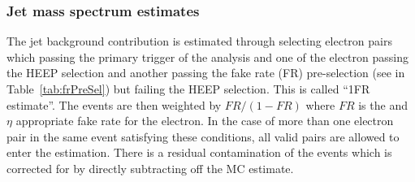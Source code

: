 %
%
%



\subsubsection{Jet mass spectrum estimates}

The jet background contribution is estimated through selecting electron pairs which passing the primary trigger of the analysis and one of the electron passing the HEEP selection and another passing the fake rate (FR) pre-selection (see in Table~\ref{tab:frPreSel}) but failing the HEEP selection. This is called ``1FR estimate''.
The events are then weighted by $FR/(1-FR)$ where $FR$ is the \et and $\eta$ appropriate fake rate for the electron. In the case of more than one electron pair in the same event satisfying these conditions, all valid pairs are allowed to enter the estimation. There is a residual contamination of the \zee events which is corrected for by directly subtracting off the MC estimate.%

